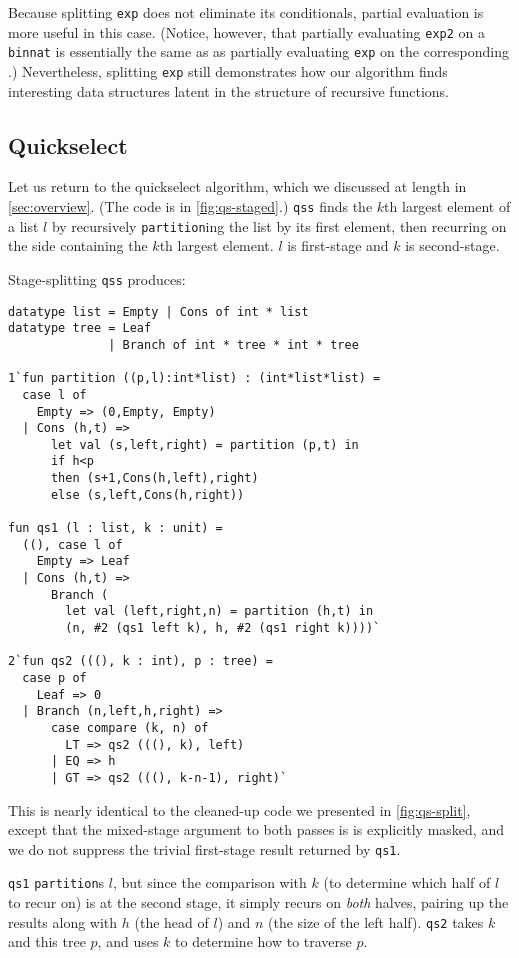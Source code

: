 Because splitting \texttt{exp} does not eliminate its conditionals, partial
evaluation is more useful in this case. (Notice, however, that partially
evaluating \texttt{exp2} on a \texttt{binnat} is essentially the same as as
partially evaluating \texttt{exp} on the corresponding \rmint.) Nevertheless,
splitting \texttt{exp} still demonstrates how our algorithm finds interesting
data structures latent in the structure of recursive functions.

\subsection{Quickselect}
\label {sec:exampleQS}

Let us return to the quickselect algorithm, which we discussed at
length in \ref{sec:overview}. (The code is in \ref{fig:qs-staged}.)
\texttt{qss} finds the $k$th largest element of a list $l$ by
recursively \texttt{partition}ing the list by its first element, then recurring
on the side containing the $k$th largest element. $l$ is first-stage and $k$ is
second-stage.

Stage-splitting \texttt{qss} produces:
%
\begin{lstlisting} 
datatype list = Empty | Cons of int * list
datatype tree = Leaf
              | Branch of int * tree * int * tree

1`fun partition ((p,l):int*list) : (int*list*list) = 
  case l of 
    Empty => (0,Empty, Empty) 
  | Cons (h,t) => 
      let val (s,left,right) = partition (p,t) in 
      if h<p 
      then (s+1,Cons(h,left),right) 
      else (s,left,Cons(h,right))

fun qs1 (l : list, k : unit) = 
  ((), case l of
    Empty => Leaf
  | Cons (h,t) => 
      Branch (
        let val (left,right,n) = partition (h,t) in
        (n, #2 (qs1 left k), h, #2 (qs1 right k))))`

2`fun qs2 (((), k : int), p : tree) = 
  case p of
    Leaf => 0
  | Branch (n,left,h,right) =>
      case compare (k, n) of 
        LT => qs2 (((), k), left) 
      | EQ => h 
      | GT => qs2 (((), k-n-1), right)`
\end{lstlisting}
%
This is nearly identical to the cleaned-up code we presented in
\ref{fig:qs-split}, except that the mixed-stage argument to both passes is
is explicitly masked, and we do not suppress the trivial first-stage result
returned by \texttt{qs1}.

\texttt{qs1} \texttt{partition}s $l$, but since the comparison with $k$ (to
determine which half of $l$ to recur on) is at the second stage, it simply
recurs on \emph{both} halves, pairing up the results along with $h$ (the head of
$l$) and $n$ (the size of the left half). \texttt{qs2} takes $k$ and this tree
$p$, and uses $k$ to determine how to traverse $p$.


